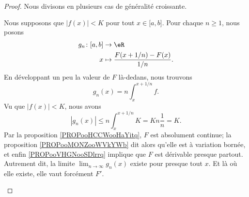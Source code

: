\begin{proof}
	Nous divisons en plusieurs cas de généralité croissante.
	\begin{subproof}
		Nous supposons que \( | f(x) |< K\) pour tout \( x\in \mathopen[ a,b\mathclose]\). Pour chaque \( n\geq 1\), nous posons
		\begin{equation}
			\begin{aligned}
				g_n\colon \mathopen[ a,b\mathclose] & \to \eR                                   \\
				x                                   & \mapsto    \frac{ F(x+1/n)-F(x) }{ 1/n }.
			\end{aligned}
		\end{equation}
		En développant un peu la valeur de \( F\) là-dedans, nous trouvons
		\begin{equation}
			g_n(x)=n\int_x^{x+1/n}f.
		\end{equation}
		Vu que \( | f(x) |<K\), nous avons
		\begin{equation}
			| g_n(x) |\leq n\int_x^{x+1/n}K=Kn\frac{1}{ n}=K.
		\end{equation}
		Par la proposition \ref{PROPooHCCWooHaYitq}, \( F\) est absolument continue; la proposition \ref{PROPooMONZooWVkYWb} dit alors qu'elle est à variation bornée, et enfin \ref{PROPooVHGNooSDlrrq} implique que \( F\) est dérivable presque partout. Autrement dit, la limite \( \lim_{n\to\infty}g_n(x)\) existe pour presque tout \( x\). Et là où elle existe, elle vaut forcément \( F'\).


\end{subproof}
\end{proof}
